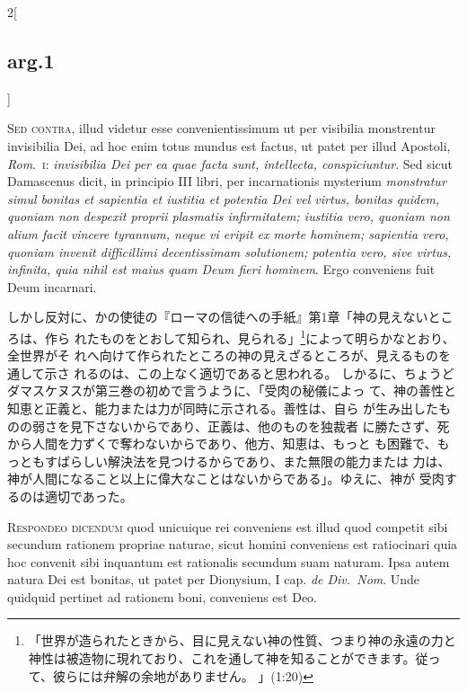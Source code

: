 \documentclass[paper=a4paper,fontsize=10pt,jafontsize=9pt,titlepage]{jlreq}
\begin{document}
\begin{paracol}{2}[\subsection{arg.1}]
\switchcolumn*[\subsection{s.c.}]

{\scshape Sed contra}, illud videtur esse convenientissimum ut per visibilia
monstrentur invisibilia Dei, ad hoc enim totus mundus est factus, ut
patet per illud Apostoli, {\itshape Rom}.~{\scshape i}: {\itshape invisibilia Dei per ea quae facta
sunt, intellecta, conspiciuntur}. Sed sicut Damascenus dicit, in
principio III libri, per incarnationis mysterium {\itshape monstratur simul
bonitas et sapientia et iustitia et potentia Dei vel virtus, bonitas
quidem, quoniam non despexit
 proprii plasmatis
 infirmitatem; iustitia
vero, quoniam non alium facit vincere tyrannum, neque vi
 eripit ex morte
hominem; sapientia vero, quoniam invenit difficillimi decentissimam
solutionem; potentia vero, sive virtus, infinita, quia nihil est maius
quam Deum fieri hominem}. Ergo conveniens fuit Deum incarnari.

\switchcolumn

しかし反対に、かの使徒の『ローマの信徒への手紙』第1章「神の見えないところは、作ら
 れたものをとおして知られ、見られる」\footnote{「世界が造られたときから、目に見えない神の性質、つまり神の永遠の力と神性は被造物に現れており、これを通して神を知ることができます。従って、彼らには弁解の余地がありません。 」(1:20)}によって明らかなとおり、全世界がそ
 れへ向けて作られたところの神の見えざるところが、見えるものを通して示さ
 れるのは、この上なく適切であると思われる。
しかるに、ちょうどダマスケヌスが第三巻の初めで言うように、「受肉の秘儀によっ
 て、神の善性と知恵と正義と、能力または力が同時に示される。善性は、自ら
 が生み出したものの弱さを見下さないからであり、正義は、他のものを独裁者
に勝たさず、死から人間を力ずくで奪わないからであり、他方、知恵は、もっと
 も困難で、もっともすばらしい解決法を見つけるからであり、また無限の能力または
 力は、神が人間になること以上に偉大なことはないからである」。ゆえに、神が
 受肉するのは適切であった。


{\scshape Respondeo dicendum} quod unicuique rei conveniens est illud quod competit
sibi secundum rationem propriae naturae, sicut homini conveniens est
ratiocinari quia hoc convenit sibi inquantum est rationalis secundum
suam naturam. Ipsa autem natura Dei est bonitas, ut patet per Dionysium,
I cap. {\itshape de Div.~Nom}. Unde quidquid pertinet ad rationem boni, conveniens
est Deo.


\end{paracol}
\end{document}
